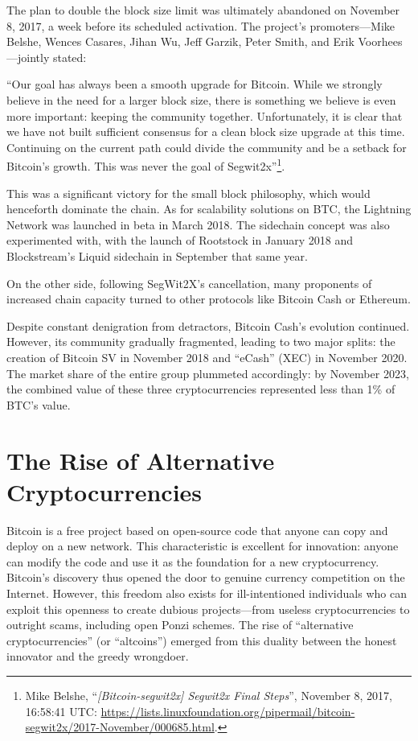 \documentclass[
  a5paper,
  smalldemyvopaper,10pt,twoside,onecolumn,openright,extrafontsizes,hidelinks]{memoir}
\begin{document}
The plan to double the block size limit was ultimately abandoned on
November 8, 2017, a week before its scheduled activation. The project's
promoters---Mike Belshe, Wences Casares, Jihan Wu, Jeff Garzik, Peter
Smith, and Erik Voorhees---jointly stated:

``Our goal has always been a smooth upgrade for Bitcoin. While we
strongly believe in the need for a larger block size, there is something
we believe is even more important: keeping the community together.
Unfortunately, it is clear that we have not built sufficient consensus
for a clean block size upgrade at this time. Continuing on the current
path could divide the community and be a setback for Bitcoin's growth.
This was never the goal of Segwit2x''\footnote{Mike Belshe,
  ``\emph{{[}Bitcoin-segwit2x{]} Segwit2x Final Steps}'', November 8,
  2017, 16:58:41 UTC:
  \url{https://lists.linuxfoundation.org/pipermail/bitcoin-segwit2x/2017-November/000685.html}.}.

This was a significant victory for the small block philosophy, which
would henceforth dominate the chain. As for scalability solutions on
BTC, the Lightning Network was launched in beta in March 2018. The
sidechain concept was also experimented with, with the launch of
Rootstock in January 2018 and Blockstream's Liquid sidechain in
September that same year.

On the other side, following SegWit2X's cancellation, many proponents of
increased chain capacity turned to other protocols like Bitcoin Cash or
Ethereum.

Despite constant denigration from detractors, Bitcoin Cash's evolution
continued. However, its community gradually fragmented, leading to two
major splits: the creation of Bitcoin SV in November 2018 and ``eCash''
(XEC) in November 2020. The market share of the entire group plummeted
accordingly: by November 2023, the combined value of these three
cryptocurrencies represented less than 1\% of BTC's value.

\section*{The Rise of Alternative
Cryptocurrencies}\label{lessor-des-cryptomonnaies-alternatives}


Bitcoin is a free project based on open-source code that anyone can copy
and deploy on a new network. This characteristic is excellent for
innovation: anyone can modify the code and use it as the foundation for
a new cryptocurrency. Bitcoin's discovery thus opened the door to
genuine currency competition on the Internet. However, this freedom also
exists for ill-intentioned individuals who can exploit this openness to
create dubious projects---from useless cryptocurrencies to outright
scams, including open Ponzi schemes. The rise of ``alternative
cryptocurrencies'' (or ``altcoins'') emerged from this duality between
the honest innovator and the greedy wrongdoer.
\end{document}

